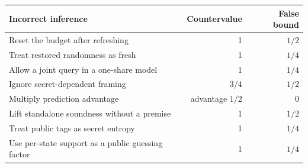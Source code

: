 \begin{tabular}{p{9.5cm}rr}
\toprule
Incorrect inference & Countervalue & False bound \\
\midrule
Reset the budget after refreshing & 1 & $1/2$ \\
Treat restored randomness as fresh & 1 & $1/4$ \\
Allow a joint query in a one-share model & 1 & $1/4$ \\
Ignore secret-dependent framing & $3/4$ & $1/2$ \\
Multiply prediction advantage & advantage $1/2$ & 0 \\
Lift standalone soundness without a premise & 1 & $1/2$ \\
Treat public tags as secret entropy & 1 & $1/4$ \\
Use per-state support as a public guessing factor & 1 & $1/4$ \\
\bottomrule
\end{tabular}

